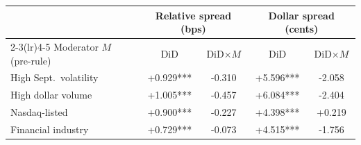 \begin{tabular}{lcccc}
\toprule
& \multicolumn{2}{c}{Relative spread (bps)} & \multicolumn{2}{c}{Dollar spread (cents)} \\
\cmidrule(lr){2-3}\cmidrule(lr){4-5}
Moderator $M$ (pre-rule) & DiD & DiD$\times M$ & DiD & DiD$\times M$ \\
\midrule
High Sept.\ volatility & +0.929*** & -0.310 & +5.596*** & -2.058 \\
High dollar volume & +1.005*** & -0.457 & +6.084*** & -2.404 \\
Nasdaq-listed & +0.900*** & -0.227 & +4.398*** & +0.219 \\
Financial industry & +0.729*** & -0.073 & +4.515*** & -1.756 \\
\bottomrule
\end{tabular}